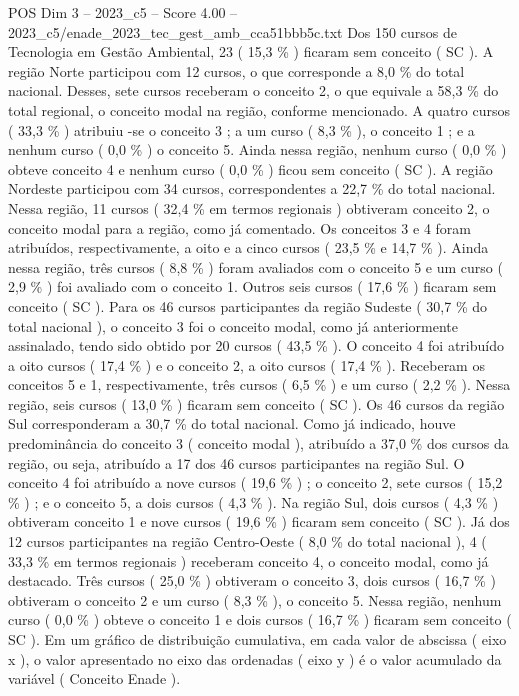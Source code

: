 \begin{textsample}{POS Dim 3 – 2023\_c5 – Score 4.00 – 2023\_c5/enade\_2023\_tec\_gest\_amb\_cca51bbb5c.txt}
Dos 150 cursos de Tecnologia em Gestão Ambiental, 23 ( 15,3 \% ) ficaram sem conceito ( SC ).
A região Norte participou com 12 cursos, o que corresponde a 8,0 \% do total nacional.
Desses, sete cursos receberam o conceito 2, o que equivale a 58,3 \% do total regional, o conceito modal na região, conforme mencionado.
A quatro cursos ( 33,3 \% ) atribuiu -se o conceito 3 ; a um curso ( 8,3 \% ), o conceito 1 ; e a nenhum curso ( 0,0 \% ) o conceito 5.
Ainda nessa região, nenhum curso ( 0,0 \% ) obteve conceito 4 e nenhum curso ( 0,0 \% ) ficou sem conceito ( SC ).
A região Nordeste participou com 34 cursos, correspondentes a 22,7 \% do total nacional.
Nessa região, 11 cursos ( 32,4 \% em termos regionais ) obtiveram conceito 2, o conceito modal para a região, como já comentado.
Os conceitos 3 e 4 foram atribuídos, respectivamente, a oito e a cinco cursos ( 23,5 \% e 14,7 \% ).
Ainda nessa região, três cursos ( 8,8 \% ) foram avaliados com o conceito 5 e um curso ( 2,9 \% ) foi avaliado com o conceito 1.
Outros seis cursos ( 17,6 \% ) ficaram sem conceito ( SC ).
Para os 46 cursos participantes da região Sudeste ( 30,7 \% do total nacional ), o conceito 3 foi o conceito modal, como já anteriormente assinalado, tendo sido obtido por 20 cursos ( 43,5 \% ).
O conceito 4 foi atribuído a oito cursos ( 17,4 \% ) e o conceito 2, a oito cursos ( 17,4 \% ).
Receberam os conceitos 5 e 1, respectivamente, três cursos ( 6,5 \% ) e um curso ( 2,2 \% ).
Nessa região, seis cursos ( 13,0 \% ) ficaram sem conceito ( SC ).
Os 46 cursos da região Sul corresponderam a 30,7 \% do total nacional.
Como já indicado, houve predominância do conceito 3 ( conceito modal ), atribuído a 37,0 \% dos cursos da região, ou seja, atribuído a 17 dos 46 cursos participantes na região Sul.
O conceito 4 foi atribuído a nove cursos ( 19,6 \% ) ; o conceito 2, sete cursos ( 15,2 \% ) ; e o conceito 5, a dois cursos ( 4,3 \% ).
Na região Sul, dois cursos ( 4,3 \% ) obtiveram conceito 1 e nove cursos ( 19,6 \% ) ficaram sem conceito ( SC ).
Já dos 12 cursos participantes na região Centro-Oeste ( 8,0 \% do total nacional ), 4 ( 33,3 \% em termos regionais ) receberam conceito 4, o conceito modal, como já destacado.
Três cursos ( 25,0 \% ) obtiveram o conceito 3, dois cursos ( 16,7 \% ) obtiveram o conceito 2 e um curso ( 8,3 \% ), o conceito 5.
Nessa região, nenhum curso ( 0,0 \% ) obteve o conceito 1 e dois cursos ( 16,7 \% ) ficaram sem conceito ( SC ).
Em um gráfico de distribuição cumulativa, em cada valor de abscissa ( eixo x ), o valor apresentado no eixo das ordenadas ( eixo y ) é o valor acumulado da variável ( Conceito Enade ).

\end{textsample}
